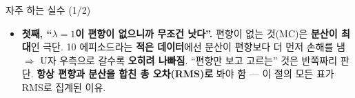 \begin{frame}{자주 하는 실수 (1/2)}
  \begin{itemize}
    \item \textbf{첫째, ``$\lambda=1$이 편향이 없으니까 무조건
      낫다''.} 편향이 없는 것(MC)은 \textbf{분산이 최대}인 극단.
      10 에피소드라는 \textbf{적은 데이터}에선 분산이 편향보다 더
      먼저 손해를 냄 $\Rightarrow$ U자 우측으로 갈수록 \textbf{오히려
      나빠짐}.
      ``편향만 보고 고르는'' 것은 반쪽짜리 판단. \textbf{항상
      편향과 분산을 합친 총 오차(RMS)로} 봐야 함 --- 이 절의 모든
      표가 RMS로 집계된 이유.
  \end{itemize}
\end{frame}
